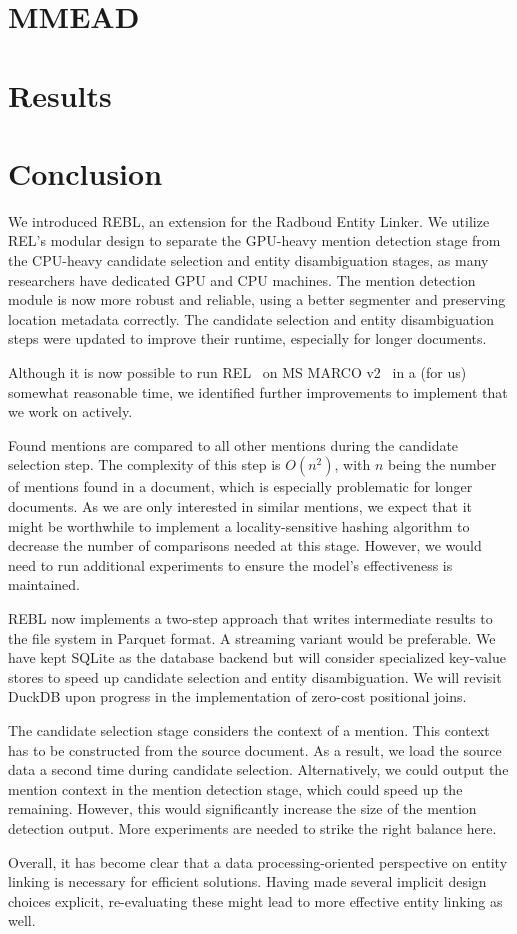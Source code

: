 \section{MMEAD}

\section{Results}

\section{Conclusion}
We introduced REBL, an extension for the Radboud Entity Linker. We utilize REL's modular design to separate the GPU-heavy mention detection stage from the CPU-heavy candidate selection and entity disambiguation stages, as many researchers have dedicated GPU and CPU machines. The mention detection module is now more robust and reliable, using a better segmenter and preserving location metadata correctly.
The candidate selection and entity disambiguation steps were updated to improve their runtime, especially for longer documents. 

Although it is now possible to run REL~\cite{REL} on MS MARCO v2~\cite{msmarco} in a (for us) somewhat reasonable time, we identified further improvements to implement that we work on actively. 

Found mentions are compared to all other mentions during the candidate selection step. The complexity of this step is $O(n^2)$, with $n$ being the number of mentions found in a document, which is especially problematic for longer documents. As we are only interested in similar mentions, we expect that it might be worthwhile to implement a locality-sensitive hashing algorithm to decrease the number of comparisons needed at this stage. However, we would need to run additional experiments to ensure the model's effectiveness is maintained. 

REBL now implements a two-step approach that writes intermediate results to the file system in Parquet format. A streaming variant would be preferable. We have kept SQLite as the database backend but will consider specialized key-value stores to speed up candidate selection and entity disambiguation. We will revisit DuckDB upon progress in the implementation of zero-cost positional joins.  

The candidate selection stage considers the context of a mention. This context has to be constructed from the source document. As a result, we load the source data a second time during candidate selection. Alternatively, we could output the mention context in the mention detection stage, which could speed up the remaining. However, this would significantly increase the size of the mention detection output. More experiments are needed to strike the right balance here.

Overall, it has become clear that a data processing-oriented perspective on entity linking is necessary for efficient solutions. Having made several implicit design choices explicit, re-evaluating these might lead to more effective entity linking as well. 
